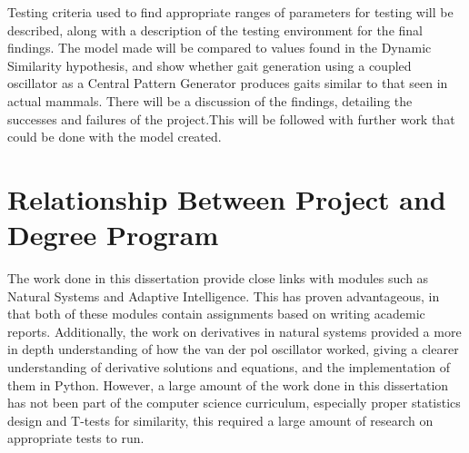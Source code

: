 Testing criteria used to find appropriate ranges of parameters for testing will be described, along with a description of the testing environment for the final findings. The model made will be compared to values found in the Dynamic Similarity hypothesis, and show whether gait generation using a coupled oscillator as a Central Pattern Generator produces gaits similar to that seen in actual mammals. There will be a discussion of the findings, detailing the successes and failures of the project.This will be followed with  further work that could be done with the model created.

\section{Relationship Between Project and Degree Program}
The work done in this dissertation provide close links with modules such as Natural Systems and Adaptive Intelligence. This has proven advantageous, in that both of these modules contain assignments based on writing academic reports. Additionally, the work on derivatives in natural systems provided a more in depth understanding of how the van der pol oscillator worked, giving a clearer understanding of derivative solutions and equations, and the implementation of them in Python. However, a large amount of the work done in this dissertation has not been part of the computer science curriculum, especially proper statistics design and T-tests for similarity, this required a large amount of research on appropriate tests to run.
